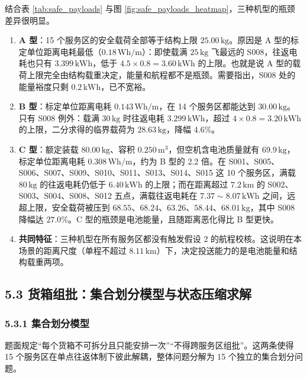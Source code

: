 \documentclass[withoutpreface,bwprint]{format}
\begin{document}
结合表 \ref{tab:safe_payloads} 与图 \ref{fig:safe_payloads_heatmap}，三种机型的瓶颈差异很明显。

\begin{enumerate}[leftmargin=*]
    \item \textbf{A 型}：15 个服务区的安全载荷全部等于结构上限 $25.00\,\text{kg}$。原因是 A 型的标定单位距离电耗最低（$0.18\,\text{Wh/m}$）：即使载满 $25\,\text{kg}$ 飞最远的 S008，往返电耗也只有 $3.399\,\text{kWh}$，低于 $4.5\times0.8=3.60\,\text{kWh}$ 的上限。也就是说 A 型的载荷上限完全由结构载重决定，能量和航程都不是瓶颈。需要指出，S008 处的能量裕度只剩 $0.2\,\text{kWh}$，已不宽裕。

    \item \textbf{B 型}：标定单位距离电耗 $0.143\,\text{Wh/m}$，在 14 个服务区都能达到 $30.00\,\text{kg}$。只有 S008 例外：载满 $30\,\text{kg}$ 时往返电耗 $3.299\,\text{kWh}$，超过 $4\times0.8=3.20\,\text{kWh}$ 的上限，二分求得的临界载荷为 $28.63\,\text{kg}$，降幅 $4.6\%$。

    \item \textbf{C 型}：额定装载 $80.00\,\text{kg}$、容积 $0.250\,\text{m}^3$，但空机含电池质量就有 $69.9\,\text{kg}$，标定单位距离电耗 $0.308\,\text{Wh/m}$，约为 B 型的 2.2 倍。在 S001、S005、S006、S007、S009、S010、S011、S013、S014、S015 这 10 个服务区，满载 $80\,\text{kg}$ 的往返电耗仍低于 $6.40\,\text{kWh}$ 的上限；而在距离超过 $7.2\,\text{km}$ 的 S002、S003、S004、S008、S012 五点，满载往返电耗在 $7.37\sim8.07\,\text{kWh}$ 之间，远超上限，安全载荷被压到 $68.55$、$68.24$、$63.26$、$58.44$、$68.01\,\text{kg}$，其中 S008 降幅达 $27.0\%$。C 型的瓶颈是电池能量，且随距离恶化得比 B 型更快。

    \item \textbf{共同特征}：三种机型在所有服务区都没有触发假设 2 的航程校核。这说明在本场景的距离尺度（单程不超过 $8.11\,\text{km}$）下，决定投送能力的是电池能量和结构载重两项。
\end{enumerate}

\subsection{5.3 货箱组批：集合划分模型与状态压缩求解}

\subsubsection{5.3.1 集合划分模型}
题面规定“每个货箱不可拆分且只能安排一次”“不得跨服务区组批”。这两条使得 15 个服务区在单点往返体制下彼此解耦，整体问题分解为 15 个独立的集合划分问题\cite{balas1976, wolsey2014}。
\end{document}
